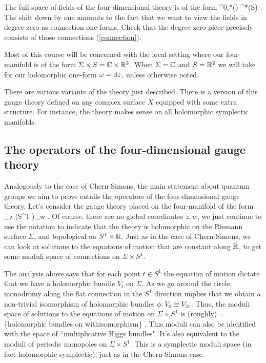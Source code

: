\documentclass[10pt]{amsart}
\begin{document}
The full space of fields of the four-dimensional theory is of the form
\ben
\Omega^{0,*}(\Sigma) \tensor \Omega^*(S) \tensor \fg[1] .
\een 
The shift down by one amounts to the fact that we want to view the fields in degree zero as connection one-forms. 
Check that the degree zero piece precisely consists of those connections (\ref{connection}). 

Most of this course will be concerned with the local setting where our four-manifold is of the form $\Sigma \times S = \mathbb C \times \mathbb R^2$. 
When $\Sigma = \mathbb C$ and $S = \mathbb R^2$ we will take for our holomorphic one-form $\omega = {\rm d} z$, unless otherwise noted. 

\begin{rmk} There are various variants of the theory just described.
There is a version of this gauge theory defined on any complex surface $X$ equipped with some extra structure. 
For instance, the theory makes sense on all holomorphic symplectic manifolds. 
\end{rmk}

\subsection{The operators of the four-dimensional gauge theory}

Analogously to the case of Chern-Simons, the main statement about quantum groups we aim to prove entails the operators of the four-dimensional gauge theory. 
Let's consider the gauge theory placed on the four-manifold of the form
\ben
\Sigma_z \times (S^1 \times \RR)_w .
\een 
Of course, there are no global coordinates $z,w$, we just continue to use the notation to indicate that the theory is holomorphic on the Riemann surface $\Sigma$, and topological on $S^1 \times \mathbb R$. 
Just as in the case of Chern-Simons, we can look at solutions to the equations of motion that are constant along $\mathbb R$, to get some moduli space of connections on $\Sigma \times S^1$. 

The analysis above says that for each point $t \in S^1$ the equation of motion dictate that we have a holomorphic bundle $V_t$ on $\Sigma$. 
As we go around the circle, monodromy along the flat connection in the $S^1$ direction implies that we obtain a non-trivial isomorphism of holomorphic bundles $\phi : V_0 \cong V_{2 \pi}$. 
Thus, the moduli space of solutions to the equations of motion on $\Sigma \times S^1$ is (roughly)
\ben
\sM = \{{\rm holomorphic \; bundles \; on} \; \Sigma \; {\rm with\;isomorphism}\} .
\een
This moduli can also be identified with the space of ``multiplicative Higgs bundles". 
It's also equivalent to the moduli of periodic monopoles on $\Sigma \times S^1$. 
This is a symplectic moduli space (in fact holomorphic symplectic), just as in the Chern-Simons case.
\end{document}
